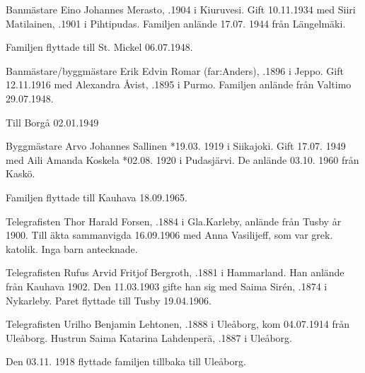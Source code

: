 {Banmästare Eino Johannes Merasto, .1904 i Kiuruvesi. Gift 10.11.1934 med Siiri Matilainen, .1901 i Pihtipudas. Familjen anlände 17.07. 1944 från Längelmäki.
\begin{jhchildren}
  \item {}
  \item {}
  \item {}
\end{jhchildren}
Familjen flyttade till St. Mickel 06.07.1948.


Banmästare/byggmästare Erik Edvin Romar (far:Anders), .1896 i Jeppo. Gift 12.11.1916 med Alexandra Åvist, .1895 i Purmo. Familjen anlände från Valtimo 29.07.1948.
\begin{jhchildren}
  \item {}
  \item {} Till Borgå 02.01.1949
  \item {}
\end{jhchildren}


Byggmästare Arvo Johannes Sallinen *19.03. 1919 i Siikajoki. Gift 17.07.
1949 med Aili Amanda Koskela *02.08. 1920 i Pudasjärvi. De anlände 03.10. 1960 från Kaskö.
\begin{jhchildren}
  \item {}
  \item {}
  \item {}
  \item {}
\end{jhchildren}
Familjen flyttade till Kauhava 18.09.1965.


Telegrafisten Thor Harald Forsen, .1884 i Gla.Karleby, anlände från Tusby år 1900. Till äkta sammanvigda 16.09.1906 med Anna Vasilijeff, som var grek. katolik. Inga barn antecknade.


Telegrafisten Rufus Arvid Fritjof Bergroth, .1881 i Hammarland. Han anlände från Kauhava 1902. Den 11.03.1903 gifte han sig med Saima Sirén, .1874 i Nykarleby. Paret flyttade till Tusby 19.04.1906.


Telegrafisten Urilho Benjamin Lehtonen, .1888 i Uleåborg, kom 04.07.1914 från Uleåborg. Hustrun Saima Katarina Lahdenperä, .1887 i Uleåborg.
\begin{jhchildren}
  \item {}
  \item {}
  \item {}
  \item {}
\end{jhchildren}
Den 03.11. 1918 flyttade familjen tillbaka till Uleåborg.


}
